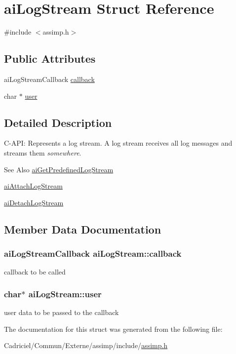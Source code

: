 \hypertarget{structai_log_stream}{\section{ai\-Log\-Stream Struct Reference}
\label{structai_log_stream}
}


{\ttfamily \#include $<$assimp.\-h$>$}

\subsection*{Public Attributes}
\begin{DoxyCompactItemize}
\item 
ai\-Log\-Stream\-Callback \hyperlink{structai_log_stream_ac73ae46eee54ba0f920d6abb97c33e97}{callback}
\item 
char $\ast$ \hyperlink{structai_log_stream_a3382042e4171a6dd5a71d7f98741f86e}{user}
\end{DoxyCompactItemize}


\subsection{Detailed Description}
C-\/\-A\-P\-I\-: Represents a log stream. A log stream receives all log messages and streams them {\itshape somewhere}. \begin{DoxySeeAlso}{See Also}
\hyperlink{assimp_8h_ad7e375d7b134ec590e812ad1f50eab94}{ai\-Get\-Predefined\-Log\-Stream} 

\hyperlink{assimp_8h_a75c5aa6027cb059e63b3dda005c9c149}{ai\-Attach\-Log\-Stream} 

\hyperlink{assimp_8h_a98ad05bb95e8f8157a97c133812a1597}{ai\-Detach\-Log\-Stream} 
\end{DoxySeeAlso}


\subsection{Member Data Documentation}
\hypertarget{structai_log_stream_ac73ae46eee54ba0f920d6abb97c33e97}{
\subsubsection[{callback}]{\setlength{\rightskip}{0pt plus 5cm}ai\-Log\-Stream\-Callback ai\-Log\-Stream\-::callback}}\label{structai_log_stream_ac73ae46eee54ba0f920d6abb97c33e97}
callback to be called \hypertarget{structai_log_stream_a3382042e4171a6dd5a71d7f98741f86e}{
\subsubsection[{user}]{\setlength{\rightskip}{0pt plus 5cm}char$\ast$ ai\-Log\-Stream\-::user}}\label{structai_log_stream_a3382042e4171a6dd5a71d7f98741f86e}
user data to be passed to the callback 

The documentation for this struct was generated from the following file\-:\begin{DoxyCompactItemize}
\item 
Cadriciel/\-Commun/\-Externe/assimp/include/\hyperlink{assimp_8h}{assimp.\-h}\end{DoxyCompactItemize}
